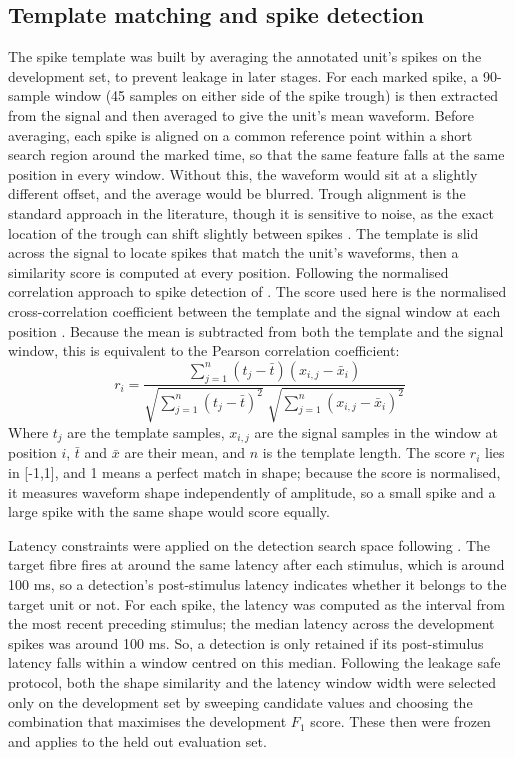 \documentclass[ %
                    author={Rzan Alkabier},
                    supervisor={Dr. Zahraa Abdallah},
                    degree={MSc},
                     title={Denoising Extracellular Recording for Spike Detection and Classification on Single Channels},
                    subtitle={Does denoising improve detection and classification performance?},
                      type={},
                      year={2026}]{dissertation}
\begin{document}
\subsection{Template matching and spike detection}
The spike template was built by averaging the annotated unit's spikes on the development set, to prevent leakage in later stages. For each marked spike, a 90-sample window (45 samples on either side of the spike trough) is then extracted from the signal and then averaged to give the unit's mean waveform. 
Before averaging, each spike is aligned on a common reference point within a short search region around the marked time, so that the same feature falls at the same position in every window. Without this, the waveform would sit at a slightly different offset, and the average would be blurred. Trough alignment is the standard approach in the literature, though it is sensitive to noise, as the exact location of the trough can shift slightly between spikes \cite{lee_non-linear_2021}. 
The template is slid across the signal to locate spikes that match the unit's waveforms, then a similarity score is computed at every position. Following the normalised correlation approach to spike detection of \cite{laboy-juarez_normalized_2019, hwang_spike_2014}. The score used here is the normalised cross-correlation coefficient between the template and the signal window at each position \cite{article}. Because the mean is subtracted from both the template and the signal window, this is equivalent to the Pearson correlation coefficient: 
\begin{equation}
    r_i = \frac{\sum_{j=1}^{n} (t_j - \bar{t})(x_{i,j} - \bar{x}_i)}
    {\sqrt{\sum_{j=1}^{n} (t_j-\bar{t})^2}\;\sqrt{\sum_{j=1}^{n} (x_{i,j} - \bar{x}_i)^2}}
\end{equation}
Where $t_j$ are the template samples, $x_{i,j}$ are the signal samples in the window at position $i$, $\bar{t}$ and $\bar{x}$ are their mean, and $n$ is the template length. The score $r_i$ lies in [-1,1], and 1 means a perfect match in shape; because the score is normalised, it measures waveform shape independently of amplitude, so a small spike and a large spike with the same shape would score equally.
\bigskip

\noindent
Latency constraints were applied on the detection search space following \cite{troglio_hybrid_2026}. The target fibre fires at around the same latency after each stimulus, which is around 100 ms, so a detection's post-stimulus latency indicates whether it belongs to the target unit or not. For each spike, the latency was computed as the interval from the most recent preceding stimulus; the median latency across the development spikes was around 100 ms. So, a detection is only retained if its post-stimulus latency falls within a window centred on this median. 
Following the leakage safe protocol, both the shape similarity and the latency window width were selected only on the development set by sweeping candidate values and choosing the combination that maximises the development $F_1$ score. These then were frozen and applies to the held out evaluation set. 
\end{document}

